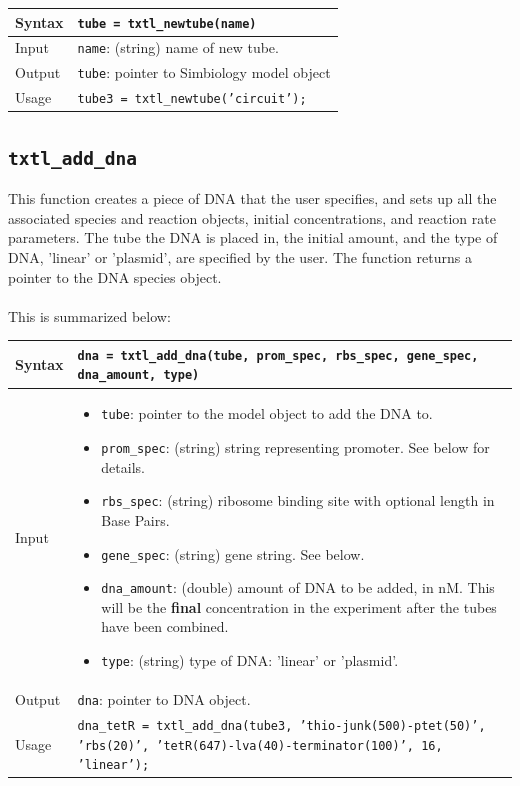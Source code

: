 \documentclass[english]{report}
\begin{document}
			\begin{tabular}{p{2cm}|p{13cm}}
			Syntax & \texttt{tube = txtl\_newtube(name)}\\ \hline
			Input & \texttt{name}: (string) name of new tube. \\ \hline
			Output & \texttt{tube}: pointer to Simbiology model object\\ \hline
			Usage & \texttt{tube3 = txtl\_newtube('circuit');}\\
			\end{tabular}	

		\subsection*{\texttt{txtl\_add\_dna}}
			This function creates a piece of DNA that the user specifies, and sets up all the associated species and reaction objects, initial concentrations, and reaction rate parameters. The tube the DNA is placed in, the initial amount, and the type of DNA, 'linear' or 'plasmid', are specified by the user. The function returns a pointer to the DNA species object. \\ 
			\\
			This is summarized below:	
			
			\begin{tabular}{p{2cm}|p{13cm}}
			Syntax & \texttt{dna = txtl\_add\_dna(tube, prom\_spec, rbs\_spec, gene\_spec, dna\_amount, type)}\\ \hline
			Input &  \begin{itemize}
				\item \texttt{tube}: pointer to the model object to add the DNA to.
				\item \texttt{prom\_spec}: (string) string representing promoter. See below for details. 
				\item \texttt{rbs\_spec}: (string) ribosome binding site with optional length in Base Pairs.
				\item \texttt{gene\_spec}: (string) gene string. See below.
				\item \texttt{dna\_amount}: (double) amount of DNA to be added, in nM. This will be the \textbf{final} concentration in the experiment after the tubes have been combined. 
				\item \texttt{type}: (string) type of DNA: 'linear' or 'plasmid'. 
				\end{itemize} \\ \hline
			Output & \texttt{dna}: pointer to DNA object. \\ \hline
			Usage & \texttt{dna\_tetR = txtl\_add\_dna(tube3, 'thio-junk(500)-ptet(50)', 'rbs(20)', 'tetR(647)-lva(40)-terminator(100)', 16, 'linear');}\\ \hline
			\end{tabular}	
			
\end{document}
